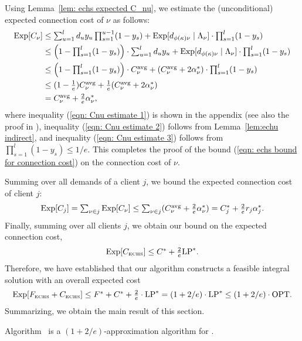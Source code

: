 Using Lemma~\ref{lem: echs expected C_nu}, we estimate the
(unconditional) expected connection cost of $\nu$ as
follows:
%
\begin{align}
  \mbox{\rm Exp}[C_\nu] &\leq 
	\textstyle \sum_{u=1}^l d_uy_u\prod_{s=1}^{u-1}(1-y_s)
		+  \mbox{\rm Exp}[ d_{\phi(\kappa)\nu}  \mid \Lambda_\nu]\cdot \prod_{s=1}^{l} (1-y_{s})
		\notag
		\\
  &\leq \textstyle \Big(1 - \prod_{s=1}^l (1-y_s)\Big) \cdot \sum_{u=1}^l d_u y_u
	+  \mbox{\rm Exp}[ d_{\phi(\kappa)\nu}  \mid \Lambda_\nu ]\cdot \prod_{s=1}^{l} (1-y_{s})
	\label{eqn: Cnu estimate 1}
	\\
  &\leq \textstyle \Big(1 - \prod_{s=1}^l (1-y_s)\Big) \cdot C^{{\mbox{\scriptsize\rm avg}}}_{\nu} 
	+ ( C^{{\mbox{\scriptsize\rm avg}}}_{\nu} + 2\alpha_{\nu}^\ast)  \cdot \prod_{s=1}^{l} (1-y_{s})
	\label{eqn: Cnu estimate 2}
	\\
   & \leq \textstyle (1-\frac{1}{e}) C^{{\mbox{\scriptsize\rm avg}}}_{\nu} 
	+	\frac{1}{e}	(C^{{\mbox{\scriptsize\rm avg}}}_{\nu} + 2\alpha_{\nu}^\ast) 
		\label{eqn: Cnu estimate 3}
	\\
	&= \textstyle C^{{\mbox{\scriptsize\rm avg}}}_{\nu} + \frac{2}{e}\alpha_{\nu}^\ast,
	\notag
\end{align}
%
where inequality (\ref{eqn: Cnu estimate 1}) is shown in the appendix
(see also the proof in \cite{ChudakS04}),
inequality (\ref{eqn: Cnu estimate 2}) follows from Lemma~\ref{lem:echu indirect},
 and inequality (\ref{eqn: Cnu estimate 3}) follows from
$\prod_{s=1}^{l} (1-y_{s})\le 1/e$.
This completes the proof of 
the bound (\ref{eqn: echs bound for connection cost}) on the connection cost of $\nu$.

Summing over all demands of a client $j$, we bound
the expected connection cost of client $j$:
%
\begin{equation*}
	\textstyle
  \mbox{\rm Exp}[C_j] = \sum_{\nu\in j} \mbox{\rm Exp}[C_\nu] 
\leq {\textstyle\sum_{\nu\in j} (C^{{\mbox{\scriptsize\rm avg}}}_{\nu} + \frac{2}{e}\alpha_{\nu}^\ast) }
  = \textstyle{ C_j^\ast + \frac{2}{e}r_j\alpha_j^\ast}.
\end{equation*}
%
Finally, summing over all clients $j$, we obtain our bound on
the expected connection cost,
%
\begin{equation*}
\textstyle	 \mbox{\rm Exp}[ C_{\mbox{\tiny\rm ECHS}}] \le C^\ast +
\frac{2}{e}\mbox{\rm LP}^\ast.
\end{equation*}
% 
Therefore, we have established that
our algorithm constructs a feasible integral solution with
an overall expected cost 
%
\begin{equation*}
  \label{eq:chudakall}
	 \mbox{\rm Exp}[ F_{\mbox{\tiny\rm ECHS}} + C_{\mbox{\tiny\rm ECHS}}]
	\le
	\textstyle
  	F^\ast + C^\ast + \frac{2}{e}\cdot \mbox{\rm LP}^\ast = (1+2/e)\cdot \mbox{\rm LP}^\ast
  \leq (1+2/e)\cdot \mbox{\rm OPT}.
\end{equation*}
%
Summarizing, we obtain the main result of this section.

\begin{theorem}\label{thm:1736}
  Algorithm~{\ECHS} is a $(1+2/e)$-approximation algorithm for \FTFP.
\end{theorem}